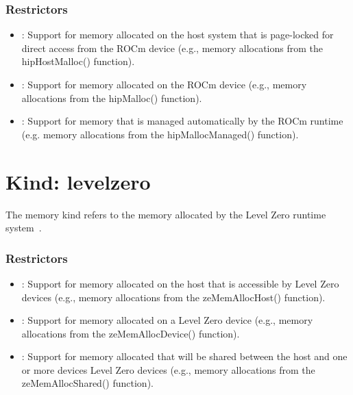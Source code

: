 \subsubsection{Restrictors}

\begin{itemize}

\item {}: Support for memory allocated on the host system that
    is page-locked for direct access from the ROCm device (e.g., memory
        allocations from the hipHostMalloc() function).

\item {}: Support for memory allocated on the ROCm device
    (e.g., memory allocations from the hipMalloc() function).

\item {}: Support for memory that is managed automatically
    by the ROCm runtime (e.g. memory allocations from the
        hipMallocManaged() function).

\end{itemize}

\section{Kind: levelzero}

The  memory kind refers to the memory allocated by the
Level Zero runtime system~\cite{zeref}.

\subsubsection{Restrictors}

\begin{itemize}

\item {}: Support for memory allocated on the host that is
    accessible by Level Zero devices (e.g., memory allocations from the
        zeMemAllocHost() function).

\item {}: Support for memory allocated on a Level Zero device
    (e.g., memory allocations from the zeMemAllocDevice() function). 

\item {}: Support for memory allocated that will be shared
    between the host and one or more devices Level Zero devices (e.g.,
        memory allocations from the zeMemAllocShared() function).

\end{itemize}
